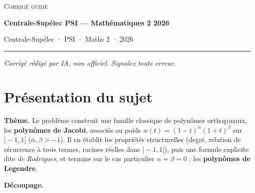 \documentclass[11pt,a4paper]{article}
\begin{document}
\thispagestyle{plain}
\begin{center}
  {\small\scshape Corrigé guidé}\par\smallskip
  {\LARGE\bfseries Centrale-Supélec PSI — Mathématiques 2 2026\par}\medskip
  {\large Centrale-Supélec · PSI · Maths 2 · 2026\par}
\end{center}
\vspace{2pt}\hrule\vspace{8pt}

\emph{Corrigé rédigé par IA, non officiel. Signalez toute erreur.}

\hypertarget{pruxe9sentation-du-sujet}{%
\section{Présentation du sujet}\label{pruxe9sentation-du-sujet}}

\textbf{Thème.} Le problème construit une famille classique de polynômes orthogonaux, les \textbf{polynômes de Jacobi}, associés au poids \(w(t)=(1-t)^\alpha(1+t)^\beta\) sur \(]-1,1[\) (\(\alpha,\beta>-1\)). Il en établit les propriétés structurelles (degré, relation de récurrence à trois termes, racines réelles dans \(]-1,1[\)), puis une formule explicite dite \emph{de Rodrigues}, et termine sur le cas particulier \(\alpha=\beta=0\) : les \textbf{polynômes de Legendre}.

\textbf{Découpage.}
\end{document}
